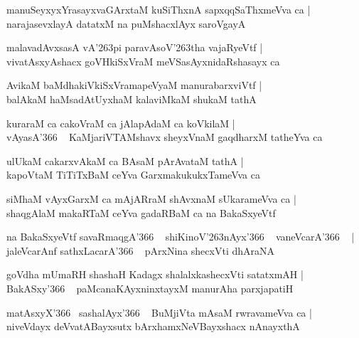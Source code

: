 \documentclass[twoside,12pt,openright]{book}
\def\S{\char'263}
\newcounter{shloka}[chapter]
\begin{document}
\begin{shloka}
manuSeyxyxYrasayxvaGArxtaM kuSiThxnA sapxqqSaThxmeVva ca |\\
narajasevxlayA datatxM na puMshacxlAyx saroVgayA 
\end{shloka}

\begin{shloka}
malavadAvxsasA vA\S pi paravAsoV\S tha vajaRyeVtf |\\
vivatAsxyAshacx goVHkiSxVraM meVSasAyxnidaRshasayx ca 
\end{shloka}

\begin{shloka}
AvikaM baMdhakiVkiSxVramapeVyaM manurabarxviVtf |\\
balAkaM haMsadAtUyxhaM kalaviMkaM shukaM tathA 
\end{shloka}

\begin{shloka}
kuraraM ca cakoVraM ca jAlapAdaM ca koVkilaM |\\
vAyasA\char'366 ~ KaMjariVTAMshavx sheyxVnaM gaqdharxM tatheYva ca
\end{shloka}

\begin{shloka}
ulUkaM cakarxvAkaM ca BAsaM pArAvataM tathA |\\
kapoVtaM TiTiTxBaM ceYva GarxmakukukxTameVva ca 
\end{shloka}

\begin{shloka}
siMhaM vAyxGarxM ca mAjARraM shAvxnaM sUkarameVva ca |\\
shaqgAlaM makaRTaM ceYva gadaRBaM ca na BakaSxyeVtf 
\end{shloka}

\begin{shloka}
na BakaSxyeVtf savaRmaqgA\char'366 ~ shiKinoV\S nAyx\char'366 ~ vaneVcarA\char'366 ~ |\\
jaleVcarAnf sathxLacarA\char'366 ~ pArxNina shecxVti dhAraNA 
\end{shloka}

\begin{shloka}
goVdha mUmaRH shashaH Kadagx shalalxkashecxVti satatxmAH |\\
BakASxy\char'366 ~ paMcanaKAyxninxtayxM manurAha parxjapatiH
\end{shloka}

\begin{shloka}
matAsxyX\char'366 ~sashalAyx\char'366 ~ BuMjiVta mAsaM rwravameVva ca |\\
niveVdayx deVvatABayxsutx bArxhamxNeVBayxshacx nAnayxthA 
\end{shloka}
\end{document}
